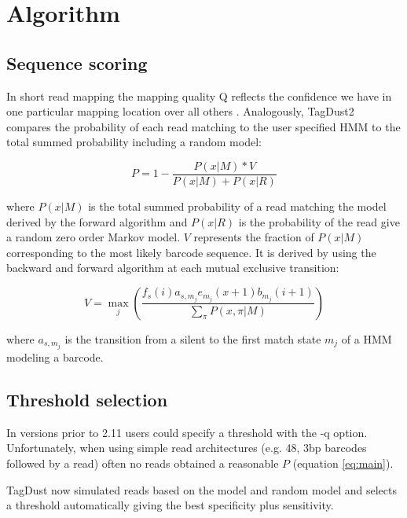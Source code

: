 \documentclass[11pt,a4paper,oneside]{book}
\begin{document}
\chapter{Algorithm}

\section{Sequence scoring} 

In short read mapping the mapping quality Q reflects the confidence we have in one particular mapping location over all others \cite{li2008mapping}. Analogously, TagDust2 compares the probability of each read matching to the user specified HMM to the total summed probability including a random model:

\begin{equation}\label{eq:main}
P = 1 - \frac{P(x|M)*V}{P(x|M) + P(x|R)}
\end{equation} 

where $P(x|M)$ is the total summed probability of a read matching the model derived by the forward algorithm and $P(x|R)$ is the probability of the read give a random zero order Markov model. $V$ represents the fraction of $P(x|M)$ corresponding to the most likely barcode sequence. It is derived by using the backward and forward algorithm at each mutual exclusive transition:

\begin{equation}
	V = \max_j \left( \frac{f_s(i)   a_{s,m_j} e_{m_j}(x+1) b_{m_j}(i+1)}{\sum\limits_{\pi} P(x,\pi | M )}\right)
\end{equation}

where $ a_{s,m_j}$ is the transition from a silent to the first match state $m_j$ of a HMM modeling a barcode.  
 

\section{Threshold selection} 

In versions prior to 2.11 users could specify a threshold with the -q option. Unfortunately, when using simple read architectures (e.g. 48, 3bp barcodes followed by a read) often no reads obtained a reasonable $P$ (equation \ref{eq:main}). 

TagDust now simulated reads based on the model and random model and selects a threshold automatically giving the best specificity plus sensitivity.  
\end{document}
